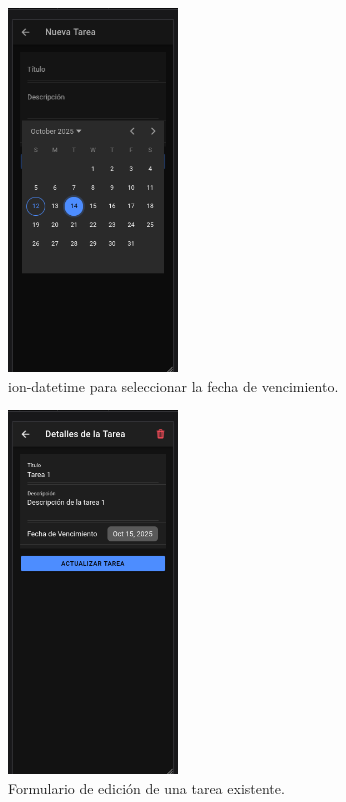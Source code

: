 \documentclass{article}
\begin{document}
\begin{figure}[htbp]
\centering
\includegraphics[width=0.4\textwidth]{captura_fecha.png}
\caption{ion-datetime para seleccionar la fecha de vencimiento.}
\end{figure}

\begin{figure}[htbp]
\centering
\includegraphics[width=0.4\textwidth]{captura_detalles.png}
\caption{Formulario de edición de una tarea existente.}
\end{figure}
\end{document}
